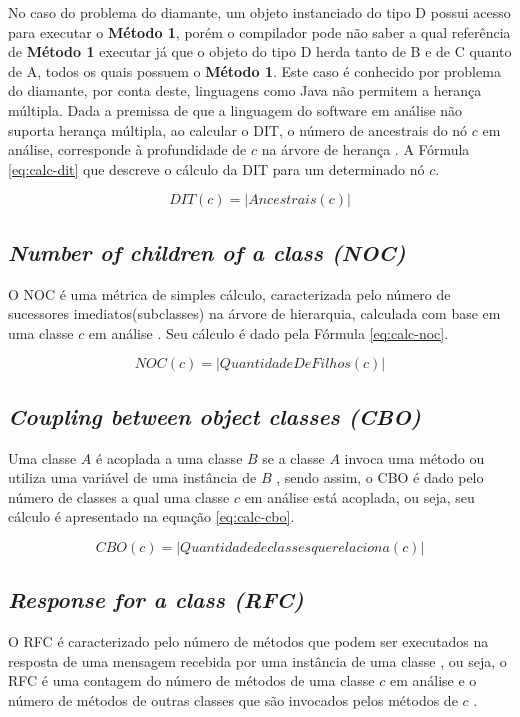 \documentclass[
	12pt,				%
	oneside,			%
	a4paper,			%
	english,			%
	brazil				%
	]{abntex2ppgsi}
\begin{document}
No caso do problema do diamante, um objeto instanciado do tipo D possui acesso para executar o \textbf{Método 1}, porém o compilador pode não saber a qual referência de \textbf{Método 1} executar já que o objeto do tipo D herda tanto de B e de C quanto de A, todos os quais possuem o \textbf{Método 1}. Este caso é conhecido por problema do diamante, por conta deste, linguagens como Java não permitem a herança múltipla. Dada a premissa de que a linguagem do software em análise não suporta herança múltipla, ao calcular o DIT, o número de ancestrais do nó $c$ em análise, corresponde à profundidade de $c$ na árvore de herança \cite{bruntink04}. A Fórmula \ref{eq:calc-dit} que descreve o cálculo da DIT para um determinado nó $c$.

\begin{equation}
  DIT(c) = |Ancestrais(c)|
	\label{eq:calc-dit}
\end{equation}

\subsection{\textit{Number of children of a class (NOC)}}

O NOC é uma métrica de simples cálculo, caracterizada pelo número de sucessores imediatos(subclasses) na árvore de hierarquia, calculada com base em  uma classe $c$ em análise \cite{kan95}. Seu cálculo é dado pela Fórmula \ref{eq:calc-noc}.

\begin{equation}
  NOC(c) = |QuantidadeDeFilhos(c)|
	\label{eq:calc-noc}
\end{equation}


\subsection{\textit{Coupling between object classes (CBO)}}
Uma classe $A$ é acoplada a uma classe $B$ se a classe $A$ invoca uma método ou utiliza uma variável de uma instância de $B$ \cite{kan95}, sendo assim, o CBO é dado pelo número de classes a qual uma classe $c$ em análise está acoplada, ou seja, seu cálculo é apresentado na equação \ref{eq:calc-cbo}.

\begin{equation}
  CBO(c) = |Quantidade de classes que relaciona(c)|
	\label{eq:calc-cbo}
\end{equation}

\subsection{\textit{Response for a class (RFC)}}
O RFC é caracterizado pelo número de métodos que podem ser executados na resposta de uma mensagem recebida por uma instância de uma classe \cite{kan95}, ou seja, o RFC é uma contagem do número de métodos de uma classe $c$ em análise e o número de métodos de outras classes que são invocados pelos métodos de $c$ \cite{bruntink04}.
\end{document}
